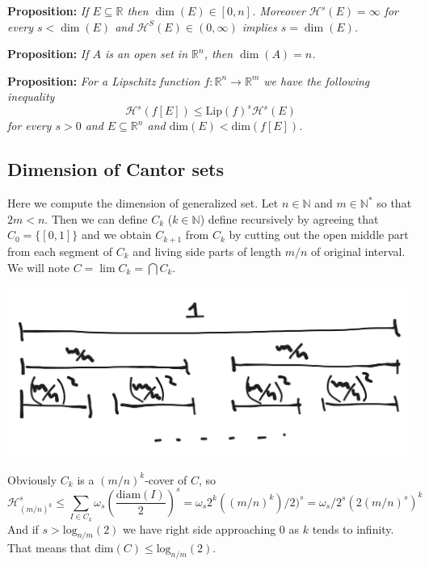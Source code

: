 \vspace{2ex}
\textbf{Proposition:} \textit{If $E\subseteq\mathbb R$ then $\dim(E)\in [0, n]$.
Moreover $\mathcal H^s(E)=\infty$ for every $s<\dim(E)$ and $\mathcal H^S(E)\in
(0,\infty)$ implies $s=\dim(E)$.}

\vspace{2ex}
\textbf{Proposition:} \textit{If $A$ is an open set in $\mathbb R^n$, then $\dim
(A) = n$.}

\vspace{2ex}
\textbf{Proposition:} \textit{For a Lipschitz function $f:\mathbb{R}^n\rightarrow
\mathbb{R}^m$ we have the following inequality
\[ \mathcal{H}^s(f[E])\leq\text{Lip}(f)^s\mathcal{H}^s(E) \]
for every $s>0$ and $E\subseteq\mathbb{R}^n$ and $\text{dim}(E)<\text{dim}(f[E])$.}

\subsection{Dimension of Cantor sets}
Here we compute the dimension of generalized set. Let $n\in\mathbb{N}$ and
$m\in\mathbb{N}^*$ so that $2m<n$. Then we can define $C_k$ ($k\in\mathbb{N}$)
define recursively by agreeing that $C_0=\{[0,1]\}$ and we obtain $C_{k+1}$ from $C_k$
by cutting out the open middle part from each segment of $C_k$ and living side parts
of length $m/n$ of original interval. We will note $C=\lim C_k=\bigcap C_k$.
\begin{center}
\includegraphics[scale=0.15]{cantor.png}
\end{center}
Obviously $C_k$ is a $(m/n)^k$-cover of $C$, so
\[ \mathcal{H}_{(m/n)^k}^s \leq \sum_{I\in C_k}\omega_s(\frac{\text{diam}(I)}{2})^s
=\omega_s2^k((m/n)^k)/2)^s=\omega_s/2^s(2(m/n)^s)^k \]
And if $s>\text{log}_{n/m}(2)$ we have right side approaching 0 as $k$ tends to
infinity. That means that $\text{dim}(C)\leq\text{log}_{n/m}(2)$.


